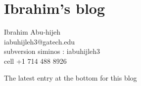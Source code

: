 


\chapter{Ibrahim's blog}
\label{chap:blogIA}
\renewcommand{\Ssym}[1]{{\ensuremath{m_{#1}}}}    %
\renewcommand{\Refl}{\ensuremath{{\sigma}}} %
\renewcommand{\shift}{\ensuremath{r}}
\renewcommand{\ssp}{\ensuremath{\phi}}             %

	
{\large Ibrahim Abu-hijeh}\\
iabuhijleh3@gatech.edu\\
subversion siminos : iabuhijleh3 \\ %
cell +1 714 488 8926

\hfill   {\color{red} The latest entry at the bottom for this blog}
\bigskip

\bigskip

